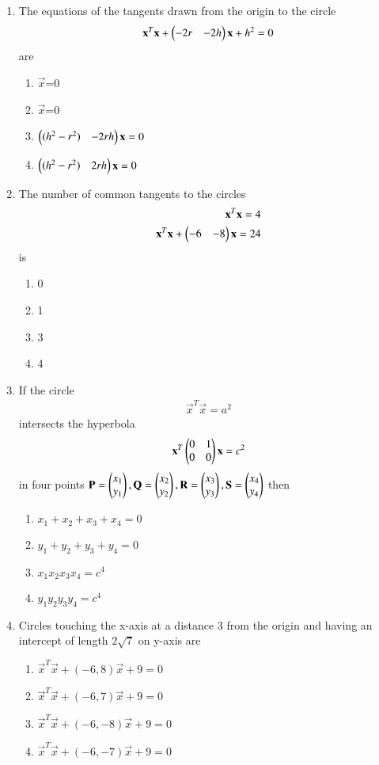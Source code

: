 \begin{enumerate}[label=\arabic*.,ref=\thesubsection.\theenumi]
\item The equations of the tangents drawn from the origin to the circle  
\begin{align}
\mathbf{x}^T\mathbf{x}+\begin{pmatrix}-2r&-2h\end{pmatrix}\mathbf{x}+h^2=0
\end{align} 
are
\begin{enumerate}
\item {} $\vec x$=0
\item {} $\vec x$=0
\item $\begin{pmatrix}(h^2-r^2)&-2rh\end{pmatrix}\mathbf x=0$
\item $\begin{pmatrix}(h^2-r^2)&2rh\end{pmatrix}\mathbf x=0$
\end{enumerate}
    
\item The number of common tangents to the circles
\begin{align}
\mathbf x^T\mathbf x=4 \\
\mathbf{x}^T\mathbf{x}+\begin{pmatrix}-6&-8\end{pmatrix}\mathbf{x}=24
\end{align} 
is
\begin{enumerate}
\item 0
\item 1
\item 3
\item 4
\end{enumerate}
    
\item If the circle 
\begin{align}
\vec{x}^T\vec{x}=a^2
\end{align}
intersects the hyperbola 
\begin{align}
\mathbf{x}^T \begin{pmatrix} 0 & 1 \\ 0 & 0\end{pmatrix}\mathbf{x}=c^2
\end{align} 
in four points $\mathbf{P}=\begin{pmatrix}x_1 \\ y_1\end{pmatrix}, \mathbf{Q}=\begin{pmatrix}x_2 \\ y_2\end{pmatrix}, \mathbf{R}=\begin{pmatrix}x_3 \\ y_3\end{pmatrix}, \mathbf{S}=\begin{pmatrix}x_4 \\ y_4\end{pmatrix}$ then
\begin{enumerate}
\item $x_1+x_2+x_3+x_4=0$
\item $y_1+y_2+y_3+y_4=0$
\item $x_1 x_2 x_3x_4=c^4$
\item $y_1 y_2 y_3 y_4=c^4$
\end{enumerate}
    
\item Circles touching the x-axis at a distance 3 from the origin and having an intercept of length $2\sqrt{7}$ on y-axis are 
\begin{enumerate}
\item $\vec x^T\vec x+(-6,8)\vec x+9=0$
\item $\vec x^T\vec x+(-6,7)\vec x+9=0$
\item $\vec x^T\vec x+(-6,-8)\vec x+9=0$
\item $\vec x^T\vec x+(-6,-7)\vec x+9=0$
\end{enumerate}
    

\end{enumerate}
